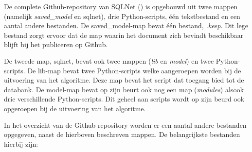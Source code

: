 De complete Github-repository van SQLNet (\textcite{sqlnet}) is opgebouwd uit twee mappen (namelijk \textit{saved\_model} en sqlnet), drie Python-scripts, één tekstbestand en een aantal andere bestanden. De saved\_model-map bevat één bestand, \textit{.keep}. Dit lege bestand zorgt ervoor dat de map waarin het document zich bevindt beschikbaar blijft bij het publiceren op Github.

De tweede map, sqlnet, bevat ook twee mappen (\textit{lib} en \textit{model}) en twee Python-scripts. De lib-map bevat twee Python-scripts welke aangeroepen worden bij de uitvoering van het algoritme. Deze map bevat het script dat toegang bied tot de databank. De model-map bevat op zijn beurt ook nog een map (\textit{modules}) alsook drie verschillende Python-scripts. Dit geheel aan scripts wordt op zijn beurd ook opgeroepen bij de uitvoering van het algoritme. 

In het overzicht van de Github-repository worden er een aantal andere bestanden opgegeven, naast de hierboven beschreven mappen. De belangrijkste bestanden hierbij zijn:

